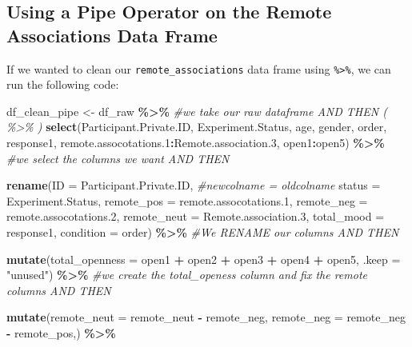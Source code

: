 \documentclass[
]{book}
\newenvironment{Shaded}{\begin{snugshade}}{\end{snugshade}}
\newcommand{\AttributeTok}[1]{\textcolor[rgb]{0.13,0.29,0.53}{#1}}
\newcommand{\CommentTok}[1]{\textcolor[rgb]{0.56,0.35,0.01}{\textit{#1}}}
\newcommand{\FloatTok}[1]{\textcolor[rgb]{0.00,0.00,0.81}{#1}}
\newcommand{\FunctionTok}[1]{\textcolor[rgb]{0.13,0.29,0.53}{\textbf{#1}}}
\newcommand{\NormalTok}[1]{#1}
\newcommand{\OtherTok}[1]{\textcolor[rgb]{0.56,0.35,0.01}{#1}}
\newcommand{\SpecialCharTok}[1]{\textcolor[rgb]{0.81,0.36,0.00}{\textbf{#1}}}
\newcommand{\StringTok}[1]{\textcolor[rgb]{0.31,0.60,0.02}{#1}}
\begin{document}
\subsection{Using a Pipe Operator on the Remote Associations Data Frame}\label{using-a-pipe-operator-on-the-remote-associations-data-frame}

If we wanted to clean our \texttt{remote\_associations} data frame using \texttt{\%\textgreater{}\%}, we can run the following code:

\begin{Shaded}
\begin{Highlighting}[]
\NormalTok{df\_clean\_pipe }\OtherTok{\textless{}{-}}\NormalTok{ df\_raw }\SpecialCharTok{\%\textgreater{}\%}  \CommentTok{\#we take our raw dataframe AND THEN ( \%\textgreater{}\% )}
  \FunctionTok{select}\NormalTok{(Participant.Private.ID, Experiment.Status, age, gender, order, response1, remote.assocotations}\FloatTok{.1}\SpecialCharTok{:}\NormalTok{Remote.association}\FloatTok{.3}\NormalTok{, open1}\SpecialCharTok{:}\NormalTok{open5) }\SpecialCharTok{\%\textgreater{}\%}  \CommentTok{\#we select the columns we want AND THEN }
  
  \FunctionTok{rename}\NormalTok{(}\AttributeTok{ID =}\NormalTok{ Participant.Private.ID, }\CommentTok{\#newcolname = oldcolname}
         \AttributeTok{status =}\NormalTok{ Experiment.Status,}
         \AttributeTok{remote\_pos =}\NormalTok{ remote.assocotations}\FloatTok{.1}\NormalTok{,}
         \AttributeTok{remote\_neg =}\NormalTok{ remote.assocotations}\FloatTok{.2}\NormalTok{,}
         \AttributeTok{remote\_neut =}\NormalTok{ Remote.association}\FloatTok{.3}\NormalTok{,}
         \AttributeTok{total\_mood =}\NormalTok{ response1,}
         \AttributeTok{condition =}\NormalTok{ order) }\SpecialCharTok{\%\textgreater{}\%} \CommentTok{\#We RENAME our columns AND THEN}
  
  \FunctionTok{mutate}\NormalTok{(}\AttributeTok{total\_openness =}\NormalTok{ open1 }\SpecialCharTok{+}\NormalTok{ open2 }\SpecialCharTok{+}\NormalTok{ open3 }\SpecialCharTok{+}\NormalTok{ open4 }\SpecialCharTok{+}\NormalTok{ open5,}
                    \AttributeTok{.keep =} \StringTok{"unused"}\NormalTok{) }\SpecialCharTok{\%\textgreater{}\%} \CommentTok{\#we create the total\_openess column and fix the remote columns AND THEN}
  
  \FunctionTok{mutate}\NormalTok{(}\AttributeTok{remote\_neut =}\NormalTok{ remote\_neut }\SpecialCharTok{{-}}\NormalTok{ remote\_neg,}
         \AttributeTok{remote\_neg =}\NormalTok{ remote\_neg }\SpecialCharTok{{-}}\NormalTok{ remote\_pos,) }\SpecialCharTok{\%\textgreater{}\%} 
  

\end{Highlighting}
\end{Shaded}
\end{document}
